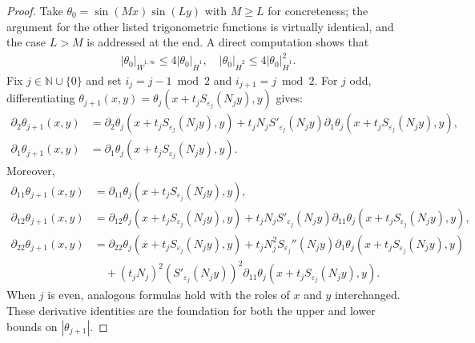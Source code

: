 \documentclass[12pt]{report}   %
\renewcommand{\le}{\leqslant}
\renewcommand{\ge}{\geqslant}
\numberwithin{equation}{section}
\theoremstyle{plain}
\theoremstyle{definition}
\theoremstyle{remark}
\newcommand{\eps}{{\varepsilon}}
\newcommand{\rd}{\partial}
\begin{document}
\begin{proof} Take $\theta_0 = \sin(Mx)\sin(Ly)$ with $M \ge L$ for concreteness; the argument for the other listed trigonometric functions is virtually identical, and the case $L > M$ is addressed at the end.
A direct computation shows that
\begin{equation*}
	\begin{split}
	|\theta_0|_{\dot{W}^{1,\infty}} \le 4|\theta_0|_{\dot{H}^1}, \quad |\theta_0|_{\dot{H}^2} \le 4 |\theta_0|_{\dot{H}^1}^2.
	\end{split}
	\end{equation*}
Fix $j\in \mathbb{N}\cup\{0\}$ and set $i_{j}=j-1 \bmod 2$ and $i_{j+1}=j \bmod 2$. For $j$ odd, differentiating $\theta_{j+1}(x,y) = \theta_j(x + t_j S_{\eps_j}(N_jy), y)$ gives:
\begin{align*}
\rd_{2} \theta_{j+1}(x,y) &= \rd_{2}\theta_j(x + t_j S_{\eps_j}(N_jy),y ) + t_jN_j S'_{\eps_j}(N_jy) \rd_{1}\theta_j(x + t_j S_{\eps_j}(N_jy),y ) , \\
\rd_{1} \theta_{j+1}(x,y) &= \rd_{1}\theta_j(x + t_j S_{\eps_j}(N_jy),y ). 
\end{align*}
Moreover, 
\begin{align*}
\rd_{11}\theta_{j+1}(x,y) &= \rd_{11} \theta_j(x + t_j S_{\eps_j}(N_jy),y ), \\
\rd_{12} \theta_{j+1}(x,y) &= \rd_{12}\theta_j(x + t_j S_{\eps_j}(N_jy),y ) + t_jN_j S'_{\eps_j}(N_jy) \rd_{11}\theta_j(x + t_j S_{\eps_j}(N_jy),y ),\\
\rd_{22} \theta_{j+1}(x,y) &= \rd_{22}\theta_j(x + t_j S_{\eps_j}(N_jy),y ) + t_jN_j^2 S_{\eps_j}''(N_j y) \rd_1\theta_j(x + t_j S_{\eps_j}(N_jy),y ) \\
& \quad + (t_jN_j)^2 (S'_{\eps_j}(N_jy))^2 \rd_{11} \theta_j(x + t_j S_{\eps_j}(N_jy),y ). 
\end{align*} 
When $j$ is even, analogous formulas hold with the roles of $x$ and $y$ interchanged. These derivative identities are the foundation for both the upper and lower bounds on $|\theta_{j+1}|$.

\medskip


\end{proof}
\end{document}
